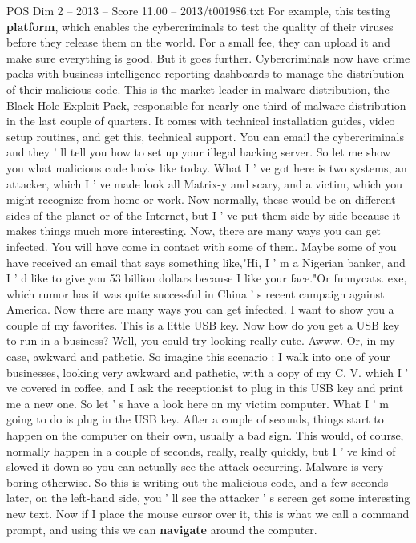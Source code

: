\begin{textsample}{POS Dim 2 – 2013 – Score 11.00 – 2013/t001986.txt}
For example, this testing \textbf{platform}, which enables the cybercriminals to test the quality of their viruses before they release them on the world.
For a small fee, they can upload it and make sure everything is good.
But it goes further.
Cybercriminals now have crime packs with business intelligence reporting dashboards to manage the distribution of their malicious code.
This is the market leader in malware distribution, the Black Hole Exploit Pack, responsible for nearly one third of malware distribution in the last couple of quarters.
It comes with technical installation guides, video setup routines, and get this, technical support.
You can email the cybercriminals and they ' ll tell you how to set up your illegal hacking server.
So let me show you what malicious code looks like today.
What I ' ve got here is two systems, an attacker, which I ' ve made look all Matrix-y and scary, and a victim, which you might recognize from home or work.
Now normally, these would be on different sides of the planet or of the Internet, but I ' ve put them side by side because it makes things much more interesting.
Now, there are many ways you can get infected.
You will have come in contact with some of them.
Maybe some of you have received an email that says something like,"Hi, I ' m a Nigerian banker, and I ' d like to give you 53 billion dollars because I like your face."Or funnycats. exe, which rumor has it was quite successful in China ' s recent campaign against America.
Now there are many ways you can get infected.
I want to show you a couple of my favorites.
This is a little USB key.
Now how do you get a USB key to run in a business?
Well, you could try looking really cute.
Awww.
Or, in my case, awkward and pathetic.
So imagine this scenario : I walk into one of your businesses, looking very awkward and pathetic, with a copy of my C.
V. which I ' ve covered in coffee, and I ask the receptionist to plug in this USB key and print me a new one.
So let ' s have a look here on my victim computer.
What I ' m going to do is plug in the USB key.
After a couple of seconds, things start to happen on the computer on their own, usually a bad sign.
This would, of course, normally happen in a couple of seconds, really, really quickly, but I ' ve kind of slowed it down so you can actually see the attack occurring.
Malware is very boring otherwise.
So this is writing out the malicious code, and a few seconds later, on the left-hand side, you ' ll see the attacker ' s screen get some interesting new text.
Now if I place the mouse cursor over it, this is what we call a command prompt, and using this we can \textbf{navigate} around the computer.

\end{textsample}
